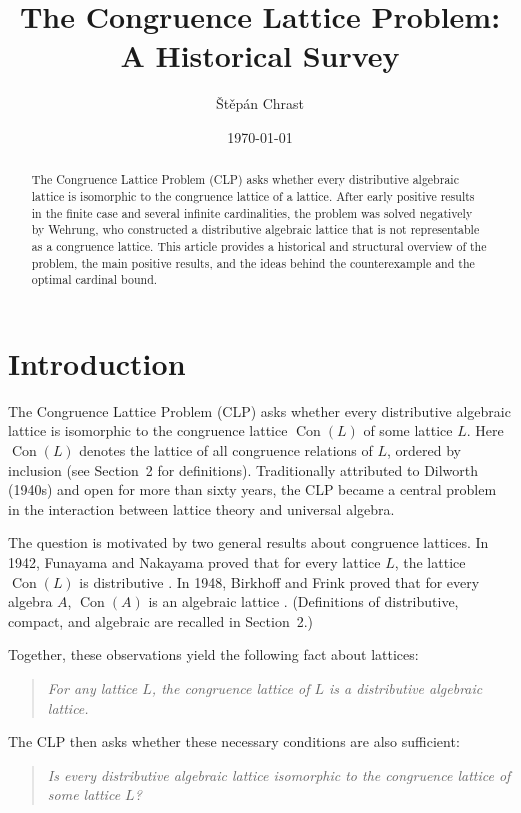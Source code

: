 ﻿\documentclass{article}
\title{The Congruence Lattice Problem: A Historical Survey}
\author{Štěpán Chrast}
\date{\today}
\begin{document}
\maketitle

\begin{abstract}
The Congruence Lattice Problem (CLP) asks whether every distributive algebraic lattice is isomorphic to the congruence lattice of a lattice. After early positive results in the finite case and several infinite cardinalities, the problem was solved negatively by Wehrung, who constructed a distributive algebraic lattice that is not representable as a congruence lattice. This article provides a historical and structural overview of the problem, the main positive results, and the ideas behind the counterexample and the optimal cardinal bound.
\end{abstract}
\tableofcontents
\newpage

\section{Introduction}

The Congruence Lattice Problem (CLP) asks whether every distributive algebraic lattice is
isomorphic to the congruence lattice $\operatorname{Con}(L)$ of some lattice $L$.
Here $\operatorname{Con}(L)$ denotes the lattice of all congruence relations of $L$,
ordered by inclusion (see Section~2 for definitions).
Traditionally attributed to Dilworth (1940s) and open for more than sixty years, the CLP became a central problem in the interaction between lattice theory and universal algebra.

The question is motivated by two general results about congruence lattices.
In 1942, Funayama and Nakayama proved that for every lattice $L$,
the lattice $\operatorname{Con}(L)$ is distributive \cite{FunayamaNakayama1942}.
In 1948, Birkhoff and Frink proved that for every algebra $A$,
$\operatorname{Con}(A)$ is an algebraic lattice \cite{BirkhoffFrink1948}.
(Definitions of distributive, compact, and algebraic are recalled in Section~2.)

Together, these observations yield the following fact about lattices:
\begin{quote}
\textit{For any lattice $L$, the congruence lattice of $L$ is a distributive algebraic lattice.}
\end{quote}

The CLP then asks whether these necessary conditions are also sufficient:
\begin{quote} \textit{Is every distributive algebraic lattice isomorphic to the congruence lattice of some lattice $L$?} \end{quote}
\end{document}
